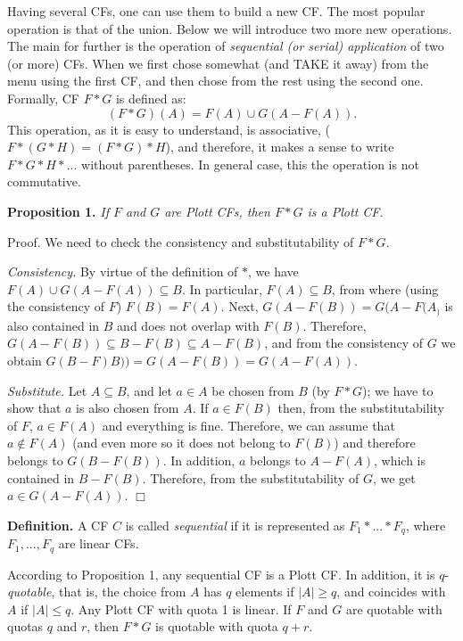 \documentclass[12pt,a4paper]{article}
\begin{document}
Having several CFs, one can use them to build a new CF. The most popular operation is that of the union. Below we will introduce two more new operations. The main for further is the operation of \emph{sequential (or serial) application} of two (or more) CFs. When we first chose somewhat (and TAKE it away) from the menu using the first CF, and then chose from the rest using the second one. Formally, CF $F*G$ is defined as:
\begin{equation}\label{seq}
                              (F*G)(A)=F(A)\cup G(A-F(A)).
\end{equation}
This operation, as it is easy to understand, is associative, ($F*(G*H)=(F*G) *H$), and therefore, it makes a sense to write $F*G*H*...$ without parentheses. In general case, this the operation is not commutative. \medskip

\textbf{Proposition 1.} \emph{If $F$ and $G$ are Plott CFs, then $F*G$ is a Plott CF.}\medskip

Proof. We need to check the consistency and substitutability of $F*G$.

\emph{Consistency.} By virtue of the definition of $*$, we have $F(A)\cup
G(A-F(A))\subseteq B$. In particular, $F(A)\subseteq B$, from where (using the
consistency of $F$) $F(B)=F(A)$. Next, $G(A-F(B))=G(A-F(A_)$ is also contained in $B$ and does not overlap with $F(B)$. Therefore, $G(A-F(B))\subseteq
B-F(B)\subseteq A-F(B)$, and from the consistency of $G$ we obtain $G(B-F)B))=G(A-F(B))=G(A-F(A))$.

\emph{Substitute.} Let $A\subseteq B$, and let $a\in A$ be chosen from $B$ (by $F*G$); we have to show that $a$ is also chosen from $A$. If $a\in F(B)$ then, from the substitutability of $F$, $a\in F(A)$ and everything is fine. Therefore, we can assume that $a\notin F(A)$ (and even more so it does not belong to $F(B)$) and therefore belongs to $G(B-F(B))$. In addition, $a$ belongs to $A-F(A)$, which is contained in $B-F(B)$. Therefore, from the substitutability of $G$, we get $a\in G(A-F(A))$. $\Box$\medskip


\textbf{Definition.} A CF $C$ is called \emph{sequential} if it is represented as $F_1*...*F_q$, where $F_1,...,F_q$ are linear CFs.\medskip


According to Proposition 1, any sequential CF is a Plott CF. In addition, it is $q$-\emph{quotable}, that is, the choice from $A$ has $q$ elements if $|A|\ge q$, and coincides with $A$ if $|A|\le q$. Any Plott CF with quota 1 is linear. If $F$ and $G$ are quotable with quotas $q$ and $r$, then $F*G$ is quotable with quota $q+r$.
\end{document}
